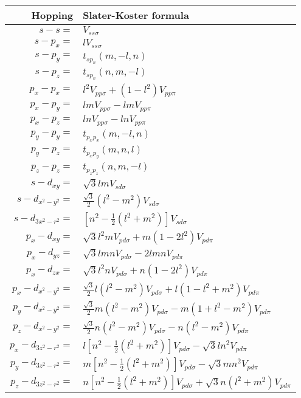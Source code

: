 \newpage
\begin{table}
\centering
\begin{tabular}{|r|l|}
 \hline
 Hopping & Slater-Koster formula \\ \hline
 $s-s=$ & $V_{ss\sigma}$ \\ \hline\hline
 $s-p_x=$ & $lV_{ss\sigma}$\\ \hline
 $s-p_y=$ & $t_{sp_x}(m,-l,n)$\\ \hline
 $s-p_z=$ & $t_{sp_x}(n,m,-l)$\\ \hline\hline
 
 $p_x-p_x=$ & $l^2 V_{pp\sigma} + \left(1-l^2\right) V_{pp\pi}$\\ \hline
 $p_x-p_y=$ & $lm V_{pp\sigma} - lm V_{pp\pi}$\\ \hline
 $p_x-p_z=$ & $ln V_{pp\sigma} - ln V_{pp\pi}$\\ \hline
 $p_y-p_y=$ & $t_{p_xp_x}(m,-l,n)$ \\ \hline
 $p_y-p_z=$ & $t_{p_xp_y}(m,n,l)$ \\ \hline
 $p_z-p_z=$ & $t_{p_zp_z}(n,m,-l)$ \\ \hline\hline
 
 $s-d_{xy}=$ & $\sqrt{3}lm V_{sd\sigma}$\\ \hline
 $s-d_{x^2-y^2}=$ & $\tfrac{\sqrt{3}}{2} (l^2-m^2) V_{sd\sigma}$\\ \hline
 $s-d_{3x^2-r^2}=$ & $ \left[n^2-\frac{1}{2}(l^2+m^2)\right] V_{sd\sigma}$\\ \hline\hline
 $p_x-d_{xy}=$ & $\sqrt{3}l^2m V_{pd\sigma} + m(1-2l^2) V_{pd\pi}$\\ \hline
 $p_x-d_{yz}=$ & $\sqrt{3}lmn V_{pd\sigma} - 2lmn V_{pd\pi}$\\ \hline
 $p_x-d_{zx}=$ & $\sqrt{3}l^2n V_{pd\sigma} + n(1-2l^2) V_{pd\pi}$\\ \hline
 $p_x-d_{x^2-y^2}=$ & $\frac{\sqrt{3}}{2}l(l^2-m^2) V_{pd\sigma} + l(1-l^2+m^2) V_{pd\pi}$\\ \hline
 $p_y-d_{x^2-y^2}=$ & $\tfrac{\sqrt{3}}{2}m(l^2-m^2) V_{pd\sigma} - m(1+l^2-m^2) V_{pd\pi}$\\ \hline
 $p_z-d_{x^2-y^2}=$ & $\tfrac{\sqrt{3}}{2}n(l^2-m^2) V_{pd\sigma} - n(l^2-m^2) V_{pd\pi}$\\ \hline
 $p_x-d_{3z^2-r^2}=$ & $l\left[n^2-\tfrac{1}{2}(l^2+m^2)\right] V_{pd\sigma}-\sqrt{3}ln^2 V_{pd\pi}$\\ \hline
 $p_y-d_{3z^2-r^2}=$ & $m\left[n^2-\tfrac{1}{2}(l^2+m^2)\right] V_{pd\sigma}-\sqrt{3}mn^2 V_{pd\pi}$\\ \hline
 $p_z-d_{3z^2-r^2}=$ & $n\left[n^2-\tfrac{1}{2}(l^2+m^2)\right] V_{pd\sigma}+ \sqrt{3}n(l^2+m^2) V_{pd\pi}$\\ \hline\hline
 

\end{tabular}
\end{table}
